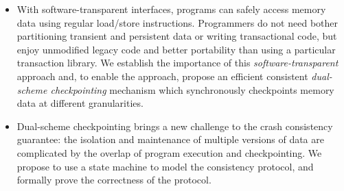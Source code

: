 \begin{eabstract}
\begin{itemize}
\item With software-transparent interfaces, programs can safely access memory
data using regular load/store instructions. Programmers do not need bother
partitioning transient and persistent data or writing transactional code, but
enjoy unmodified legacy code and better portability than using a particular
transaction library. We establish the importance of this
\emph{software-transparent} approach and, to enable the approach, propose an
efficient consistent \emph{dual-scheme checkpointing} mechanism which
synchronously checkpoints memory data at different granularities.

\item Dual-scheme checkpointing brings a new challenge to the crash consistency
guarantee: the isolation and maintenance of multiple versions of data are
complicated by the overlap of program execution and checkpointing. We propose
to use a state machine to model the consistency protocol, and formally prove
the correctness of the protocol.

\end{itemize}

\end{eabstract}


